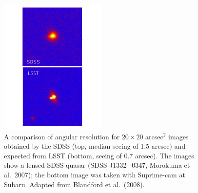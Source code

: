 \begin{figure}
\begin{center}
\includegraphics[width=0.47\textwidth,clip]{panels2.pdf}
\end{center}
\caption{A comparison of angular resolution for $20\times20$ arcsec$^2$ images obtained
by the SDSS (top, median seeing of 1.5 arcsec) and expected from LSST (bottom,
seeing of 0.7 arcsec). The images show a lensed SDSS quasar (SDSS J1332+0347,
Morokuma et al.~2007); the bottom image was taken with Suprime-cam at Subaru.
Adapted from Blandford et al.~(2008).}
\label{Fig:panels2}
\end{figure}
